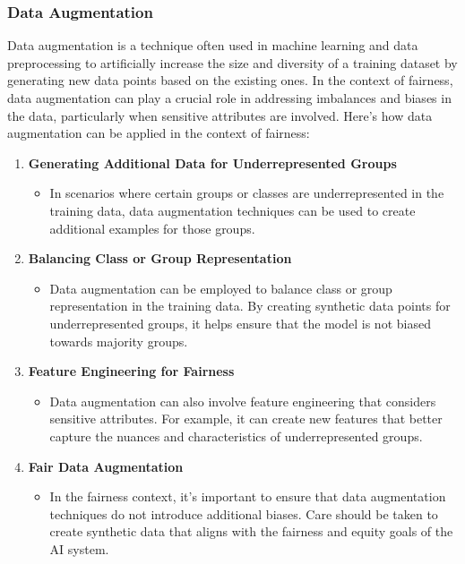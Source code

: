 \documentclass[12pt,a4paper,openright,twoside]{book}
\begin{document}
\subsubsection{Data Augmentation}
Data augmentation is a technique often used in machine learning and data preprocessing to artificially increase the size and diversity of a training dataset by generating new data points based on the existing ones. In the context of fairness, data augmentation can play a crucial role in addressing imbalances and biases in the data, particularly when sensitive attributes are involved. Here's how data augmentation can be applied in the context of fairness:
\begin{enumerate}
    \item \textbf{Generating Additional Data for Underrepresented Groups}
    \begin{itemize}
        \item In scenarios where certain groups or classes are underrepresented in the training data, data augmentation techniques can be used to create additional examples for those groups. \cite{sharma2020data}
    \end{itemize}
    \item \textbf{Balancing Class or Group Representation}
    \begin{itemize}
        \item Data augmentation can be employed to balance class or group representation in the training data. By creating synthetic data points for underrepresented groups, it helps ensure that the model is not biased towards majority groups.
    \end{itemize}
    \item \textbf{Feature Engineering for Fairness}
    \begin{itemize}
        \item Data augmentation can also involve feature engineering that considers sensitive attributes. For example, it can create new features that better capture the nuances and characteristics of underrepresented groups. \cite{10.14778/3461535.3463474}
    \end{itemize}
    \item \textbf{Fair Data Augmentation}
    \begin{itemize}
        \item In the fairness context, it's important to ensure that data augmentation techniques do not introduce additional biases. Care should be taken to create synthetic data that aligns with the fairness and equity goals of the AI system. \cite{10.1145/3531146.3534644}
    \end{itemize}
\end{enumerate}
\end{document}
